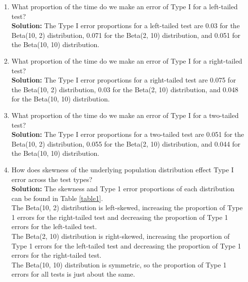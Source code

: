 \documentclass{article}\usepackage[]{graphicx}\usepackage[]{xcolor}
\begin{document}
\begin{enumerate}
  \begin{enumerate}
    \item What proportion of the time do we make an error of Type I for a
    left-tailed test? \\
    \textbf{Solution:} The Type I error proportions for a left-tailed test are 0.03 for the Beta(10, 2) distribution, 0.071 for the Beta(2, 10) distribution, and 0.051 for the Beta(10, 10) distribution. 
    \item What proportion of the time do we make an error of Type I for a
    right-tailed test? \\
    \textbf{Solution:} The Type I error proportions for a right-tailed test are 0.075 for the Beta(10, 2) distribution, 0.03 for the Beta(2, 10) distribution, and 0.048 for the Beta(10, 10) distribution. 
    \item What proportion of the time do we make an error of Type I for a
    two-tailed test? \\
    \textbf{Solution:} The Type I error proportions for a two-tailed test are 0.051 for the Beta(10, 2) distribution, 0.055 for the Beta(2, 10) distribution, and 0.044 for the Beta(10, 10) distribution. 
    \item How does skewness of the underlying population distribution effect
    Type I error across the test types? \\
    \textbf{Solution:} The skewness and Type 1 error proportions of each distribution can be found in Table \ref{table1}. \\
The Beta(10, 2) distribution is left-skewed, increasing the proportion of Type 1 errors for the right-tailed test and decreasing the proportion of Type 1 errors for the left-tailed test. \\
The Beta(2, 10) distribution is right-skewed, increasing the proportion of Type 1 errors for the left-tailed test and decreasing the proportion of Type 1 errors for the right-tailed test. \\
The Beta(10, 10) distribution is symmetric, so the proportion of Type 1 errors for all tests is just about the same. 
  
  \end{enumerate}
\end{enumerate}

\end{document}
